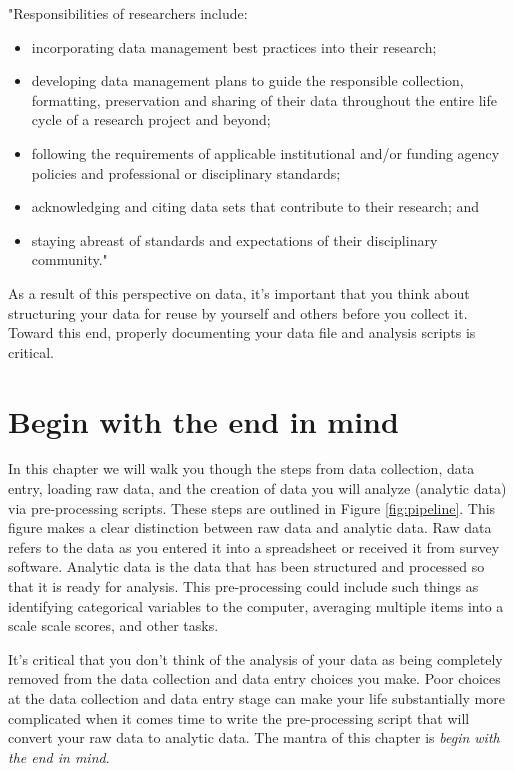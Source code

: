 \documentclass[
]{krantz}
\providecommand{\tightlist}{%
  \setlength{\itemsep}{0pt}\setlength{\parskip}{0pt}}
\begin{document}
"Responsibilities of researchers include:

\begin{itemize}
\tightlist
\item
  incorporating data management best practices into their research;
\item
  developing data management plans to guide the responsible collection, formatting, preservation and sharing of their data throughout the entire life cycle of a research project and beyond;
\item
  following the requirements of applicable institutional and/or funding agency policies and professional or disciplinary standards;
\item
  acknowledging and citing data sets that contribute to their research; and
\item
  staying abreast of standards and expectations of their disciplinary community."
\end{itemize}

As a result of this perspective on data, it's important that you think about structuring your data for reuse by yourself and others before you collect it. Toward this end, properly documenting your data file and analysis scripts is critical.

\hypertarget{begin-with-the-end-in-mind}{%
\section{Begin with the end in mind}\label{begin-with-the-end-in-mind}}

In this chapter we will walk you though the steps from data collection, data entry, loading raw data, and the creation of data you will analyze (analytic data) via pre-processing scripts. These steps are outlined in Figure \ref{fig:pipeline}. This figure makes a clear distinction between raw data and analytic data. Raw data refers to the data as you entered it into a spreadsheet or received it from survey software. Analytic data is the data that has been structured and processed so that it is ready for analysis. This pre-processing could include such things as identifying categorical variables to the computer, averaging multiple items into a scale scale scores, and other tasks.

It's critical that you don't think of the analysis of your data as being completely removed from the data collection and data entry choices you make. Poor choices at the data collection and data entry stage can make your life substantially more complicated when it comes time to write the pre-processing script that will convert your raw data to analytic data. The mantra of this chapter is \emph{begin with the end in mind}.
\end{document}
